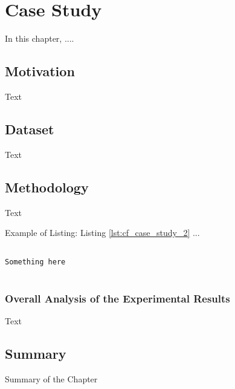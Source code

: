 \chapter{Case Study}
\label{chap:chap5}

In this chapter, ....

\section{Motivation}

Text

\section{Dataset}

Text

\section{Methodology}

Text

Example of Listing: Listing \ref{lst:cf_case_study_2} ...
\begin{lstlisting}[label={lst:cf_case_study_2}, caption={Caption.},frame=tb, basicstyle=\footnotesize]

Something here
	
\end{lstlisting}	
		
\subsection{Overall Analysis of the Experimental Results}

Text

\section{Summary}

Summary of the Chapter